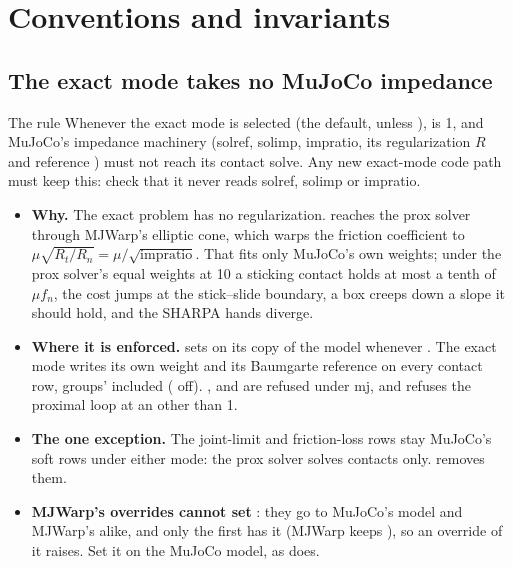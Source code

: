 \section{Conventions and invariants}\label{sec:conventions}

\subsection{The exact mode takes no MuJoCo impedance}\label{sec:impedance}

\begin{notebox}{The rule}
Whenever the exact mode is selected (the default, unless ),  is 1, and MuJoCo's impedance machinery (solref, solimp, impratio, its regularization $R$ and reference ) must not reach its contact solve. Any new exact-mode code path must keep this: check that it never reads solref, solimp or impratio.
\end{notebox}

\begin{itemize}
\item \textbf{Why.} The exact problem has no regularization.  reaches the prox solver through MJWarp's elliptic cone, which warps the friction coefficient to $\mu\sqrt{R_t/R_n} = \mu/\sqrt{\text{impratio}}$. That fits only MuJoCo's own weights; under the prox solver's equal weights at  10 a sticking contact holds at most a tenth of $\mu f_n$, the cost jumps at the stick--slide boundary, a box creeps down a slope it should hold, and the SHARPA hands diverge.
\item \textbf{Where it is enforced.}  sets  on its copy of the model whenever . The exact mode writes its own weight and its Baumgarte reference on every contact row, groups' included ( off). ,  and  are refused under mj, and  refuses the proximal loop at an  other than 1.
\item \textbf{The one exception.} The joint-limit and friction-loss rows stay MuJoCo's soft rows under either mode: the prox solver solves contacts only.  removes them.
\item \textbf{MJWarp's overrides cannot set }: they go to MuJoCo's model and MJWarp's alike, and only the first has it (MJWarp keeps ), so an override of it raises. Set it on the MuJoCo model, as  does.
\end{itemize}


